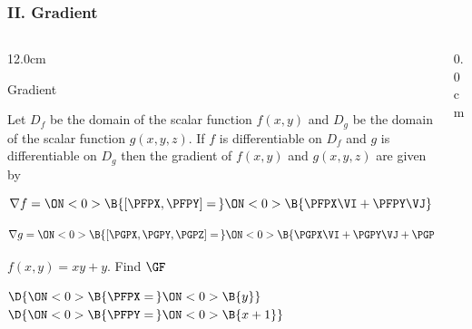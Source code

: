 \begin{frame}
\frametitle{II. Gradient}
\scriptsize
\begin{columns}
\begin{column}{12.0cm}

\DEF Gradient

\vspace{0.2cm}

Let $D_f$ be the domain of the scalar function $f(x,y)$ and $D_g$ be the domain of the scalar function $g(x,y,z)$.  If $f$ is differentiable on $D_f$ and $g$ is differentiable on $D_g$ then the gradient of $f(x,y)$ and $g(x,y,z)$ are given by

\vspace{0.2cm}

$$\nabla f = \ON<0>{\B{\left[\PFPX,\PFPY\right] =\,}} \ON<0>{\B{\PFPX \VI + \PFPY \VJ}}$$

\vspace{0.2cm}

$$\nabla g = \ON<0>{\B{\left[\PGPX,\PGPY,\PGPZ\right] =\,}} \ON<0>{\B{\PGPX \VI + \PGPY \VJ + \PGPZ \VK}}$$

\vspace{0.8cm}

\EX $f(x,y) = xy + y$. \quad Find $\GF$

\vspace{0.2cm}

\SOL

\vspace{0.2cm}

$\D{\ON<0>{\B{\PFPX =\,}} 
\ON<0>{\B{y}}}$ \quad 
{} \quad $\D{
\ON<0>{\B{\PFPY =\,}} 
\ON<0>{\B{x + 1}}}$ \quad 
{} \quad 
{}

\end{column}
\begin{column}{0.0cm}\end{column}
\end{columns}
\end{frame}

